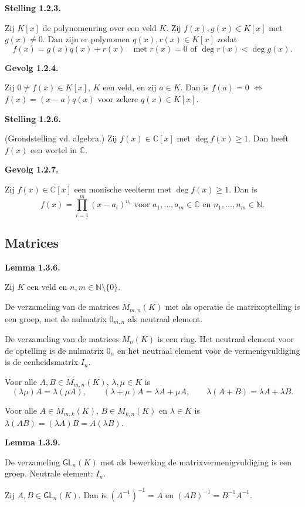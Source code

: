 \documentclass[10pt,a4paper]{article}
\newenvironment{res}[2]{%
  \par\noindent\textbf{#1 #2.}%
}{%
  \par\vspace{2pt}\normalfont
}
\begin{document}
\begin{res}{Stelling}{1.2.3}
Zij $K[x]$ de polynomenring over een veld $K$. Zij $f(x),g(x)\in K[x]$ met $g(x)\ne0$. Dan zijn er polynomen $q(x),r(x)\in K[x]$ zodat
\[
f(x)=g(x)q(x)+r(x)\quad\text{met } r(x)=0 \text{ of } \deg r(x)<\deg g(x).
\]
\end{res}

\begin{res}{Gevolg}{1.2.4}
Zij $0\ne f(x)\in K[x]$, $K$ een veld, en zij $a\in K$. Dan is $f(a)=0$ \(\iff\) $f(x)=(x-a)q(x)$ voor zekere $q(x)\in K[x]$.
\end{res}

\begin{res}{Stelling}{1.2.6}
\textup{(Grondstelling vd. algebra.)} Zij $f(x)\in\mathbb C[x]$ met $\deg f(x)\ge1$. Dan heeft $f(x)$ een wortel in $\mathbb C$.
\end{res}

\begin{res}{Gevolg}{1.2.7}
Zij $f(x)\in\mathbb C[x]$ een monische veelterm met $\deg f(x)\ge1$. Dan is
\[
f(x)=\prod_{i=1}^m (x-a_i)^{n_i}
\text{ voor } a_1,\dots,a_m\in\mathbb C \text{ en } n_1,\dots,n_m\in\mathbb N.
\]
\end{res}

\subsection{Matrices}
\begin{res}{Lemma}{1.3.6}
Zij $K$ een veld en $n,m\in\mathbb N\setminus\{0\}$.
\begin{myenum}
\item De verzameling van de matrices $M_{m,n}(K)$ met als operatie de matrixoptelling is een groep, met de nulmatrix $0_{m,n}$ als neutraal element.
\item De verzameling van de matrices $M_n(K)$ is een ring. Het neutraal element voor de optelling is de nulmatrix $0_n$ en het neutraal element voor de vermenigvuldiging is de eenheidsmatrix $I_n$.
\item Voor alle $A,B\in M_{m,n}(K)$, $\lambda,\mu\in K$ is
\[
(\lambda\mu)A=\lambda(\mu A),\qquad (\lambda+\mu)A=\lambda A+\mu A,\qquad \lambda(A+B)=\lambda A+\lambda B.
\]
\item Voor alle $A\in M_{m,k}(K)$, $B\in M_{k,n}(K)$ en $\lambda\in K$ is $\lambda(AB)=(\lambda A)B=A(\lambda B)$.
\end{myenum}
\end{res}

\begin{res}{Lemma}{1.3.9}
\begin{myenum}
\item De verzameling $\mathsf{GL}_n(K)$ met als bewerking de matrixvermenigvuldiging is een groep. Neutrale element: $I_n$.
\item Zij $A,B\in\mathsf{GL}_n(K)$. Dan is $(A^{-1})^{-1}=A$ en $(AB)^{-1}=B^{-1}A^{-1}$.
\end{myenum}
\end{res}
\end{document}
